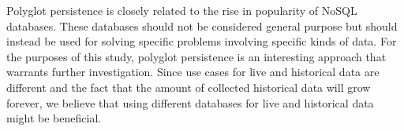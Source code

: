 
Polyglot persistence is closely related to the rise in popularity of NoSQL databases. These databases should not be considered general purpose \cite{Catell, polyglotms} but should instead be used for solving specific problems involving specific kinds of data. For the purposes of this study, polyglot persistence is an interesting approach that warrants further investigation. Since use cases for live and historical data are different and the fact that the amount of collected historical data will grow forever, we believe that using different databases for live and historical data might be beneficial. 




%
%

